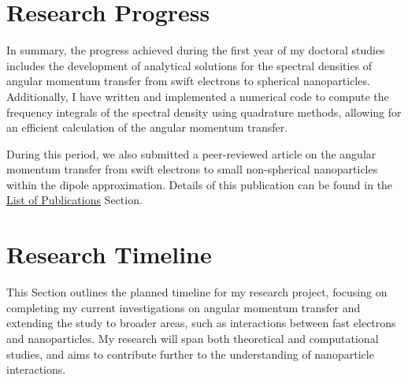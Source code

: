 \label{cap: work plan}

\section{Research Progress}

In summary, the progress achieved during the first year of my doctoral studies includes the development of analytical solutions for the spectral densities of angular momentum transfer from swift electrons to spherical nanoparticles. Additionally, I have written and implemented a numerical code to compute the frequency integrals of the spectral density using quadrature methods, allowing for an efficient calculation of the angular momentum transfer.

During this period, we also submitted a peer-reviewed article on the angular momentum transfer from swift electrons to small non-spherical nanoparticles within the dipole approximation. Details of this publication can be found in the \hyperref[cap: list of publications]{List of Publications} Section.


\section{Research Timeline}

This Section outlines the planned timeline for my research project, focusing on completing my current investigations on angular momentum transfer and extending the study to broader areas, such as interactions between fast electrons and nanoparticles. My research will span both theoretical and computational studies, and aims to contribute further to the understanding of nanoparticle interactions.

